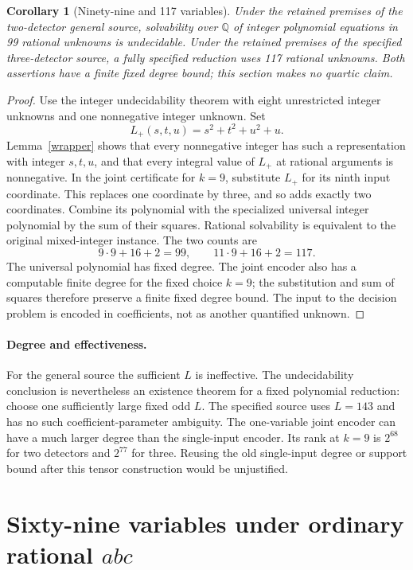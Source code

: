 \documentclass[11pt]{article}
\newtheorem{corollary}[theorem]{Corollary}
\begin{document}
\begin{corollary}[Ninety-nine and 117 variables]
\label{cor:99-117}
Under the retained premises of the two-detector general source,
solvability over $\mathbb Q$ of integer polynomial equations in
99 rational unknowns is undecidable.  Under the retained premises
of the specified three-detector source, a fully specified reduction
uses 117 rational unknowns.  Both assertions have a finite fixed
degree bound; this section makes no quartic claim.
\end{corollary}
\begin{proof}
Use the integer undecidability theorem with eight unrestricted
integer unknowns and one nonnegative integer unknown.  Set
\[
                    L_+(s,t,u)=s^2+t^2+u^2+u.
\]
Lemma~\ref{wrapper} shows that every nonnegative
integer has such a representation with integer $s,t,u$, and that
every integral value of $L_+$ at rational arguments is nonnegative.
In the joint certificate for $k=9$, substitute $L_+$ for its ninth
input coordinate.  This replaces one coordinate by three, and so
adds exactly two coordinates.  Combine its polynomial with the
specialized universal integer polynomial by the sum of their
squares.  Rational solvability is equivalent to the original
mixed-integer instance.  The two counts are
\[
                    9\cdot9+16+2=99,
             \qquad 11\cdot9+16+2=117.
\]
The universal polynomial has fixed degree.  The joint encoder also
has a computable finite degree for the fixed choice $k=9$; the
substitution and sum of squares therefore preserve a finite fixed
degree bound.  The input to the decision problem is encoded in
coefficients, not as another quantified unknown.
\end{proof}

\paragraph{Degree and effectiveness.}
For the general source the sufficient $L$ is ineffective.  The
undecidability conclusion is nevertheless an existence theorem for
a fixed polynomial reduction: choose one sufficiently large fixed
odd $L$.  The specified source uses $L=143$ and has no such
coefficient-parameter ambiguity.  The one-variable joint encoder
can have a much larger degree than the single-input encoder.  Its
rank at $k=9$ is $2^{68}$ for two detectors and $2^{77}$ for
three.  Reusing the old single-input degree or support bound after
this tensor construction would be unjustified.

\section{Sixty-nine variables under ordinary rational \texorpdfstring{$abc$}{abc}}
\label{sec:shared-abc}
\end{document}
